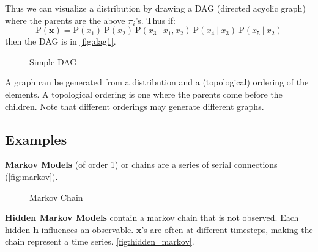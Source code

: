 \documentclass{article}
\newcommand{\prob}{\text{P}}
\newcommand{\pr}{\prob}
\renewcommand{\vec}[1]{\mathbf{#1}}
\newcommand{\bx}{\vec{x}}
\newcommand{\giv}{\ |\ }
\begin{document}
Thus we can visualize a distribution by drawing a DAG (directed acyclic graph) where the parents are the above $\pi_i$'s. Thus if:
% 
\begin{equation*}
    \pr(\bx) = \pr(x_1)\ \pr(x_2)\ \pr(x_3 \giv x_1,x_2)\ \pr(x_4 \giv x_3)\ \pr(x_5 \giv x_2)
\end{equation*}
% 
then the DAG is in \autoref{fig:dag1}.

\begin{figure}[h]
    \centering
    \caption{Simple DAG}
    \label{fig:dag1}
\end{figure}

A graph can be generated from a distribution and a (topological) ordering of the elements. A topological ordering is one where the parents come before the children. Note that different orderings may generate different graphs.

\subsection{Examples}

\textbf{Markov Models} (of order 1) or chains are a series of serial connections (\autoref{fig:markov}).

\begin{figure}[h]
    \centering
    \caption{Markov Chain}
    \label{fig:markov}
\end{figure}

\textbf{Hidden Markov Models} contain a markov chain that is not observed. Each hidden $\mathbf{h}$ influences an observable. $\mathbf{x}$'s are often at different timesteps, making the chain represent a time series. \autoref{fig:hidden_markov}.
\end{document}
